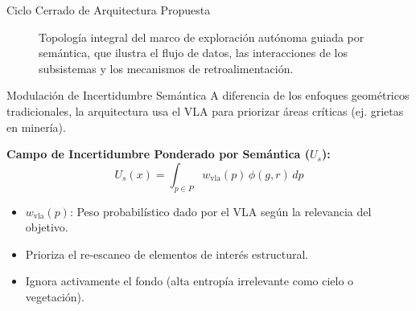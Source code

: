 \documentclass[aspectratio=169]{beamer}
\begin{document}
\begin{frame}{Ciclo Cerrado de Arquitectura Propuesta}
\begin{figure}[h]
{%
				
				
			}
			\caption{Topología integral del marco de exploración autónoma guiada por semántica, que ilustra el flujo de datos, las interacciones de los subsistemas y los mecanismos de retroalimentación.}	
		\end{figure}
		
	\end{frame}
	
	\begin{frame}{Modulación de Incertidumbre Semántica}
		\justifying
		A diferencia de los enfoques geométricos tradicionales, la arquitectura usa el VLA para priorizar áreas críticas (ej. grietas en minería).
		
		\vspace{1ex}
		\textbf{Campo de Incertidumbre Ponderado por Semántica ($U_s$):}
		\begin{equation}
			U_s(x) = \int_{p \in P} w_{\text{vla}}(p)\,\phi(g,r)\, dp
		\end{equation}
		
		\vspace{1ex}
		\begin{itemize}
			\item $w_{\text{vla}}(p)$: Peso probabilístico dado por el VLA según la relevancia del objetivo.
			\item Prioriza el re-escaneo de elementos de interés estructural.
			\item Ignora activamente el fondo (alta entropía irrelevante como cielo o vegetación).
		\end{itemize}
	\end{frame}
	
	
\end{document}
